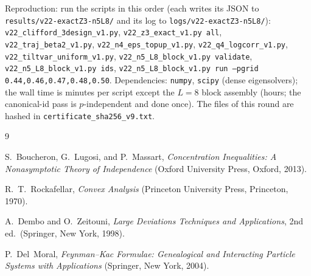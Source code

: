 \documentclass[aps,prx,reprint,superscriptaddress,nobibnotes,longbibliography]{revtex4-2}
\begin{document}
Reproduction: run the scripts in this order (each writes its JSON to
\texttt{results/v22-exactZ3-n5L8/} and its log to
\texttt{logs/v22-exactZ3-n5L8/}): \texttt{v22\_clifford\_3design\_v1.py},
\texttt{v22\_z3\_exact\_v1.py all},
\texttt{v22\_traj\_beta2\_v1.py},
\texttt{v22\_n4\_eps\_topup\_v1.py},
\texttt{v22\_q4\_logcorr\_v1.py},
\texttt{v22\_tiltvar\_uniform\_v1.py},
\texttt{v22\_n5\_L8\_block\_v1.py validate},
\texttt{v22\_n5\_L8\_block\_v1.py ids},
\texttt{v22\_n5\_L8\_block\_v1.py run --pgrid 0.44,0.46,0.47,0.48,0.50}.
Dependencies: \texttt{numpy}, \texttt{scipy} (dense eigensolvers); the
wall time is minutes per script except the $L=8$ block assembly (hours;
the canonical-id pass is $p$-independent and done once).  The files of
this round are hashed in \texttt{certificate\_sha256\_v9.txt}.

\begin{thebibliography}{9}

 S.~Boucheron, G.~Lugosi, and P.~Massart,
\emph{Concentration Inequalities: A Nonasymptotic Theory of Independence}
(Oxford University Press, Oxford, 2013).

 R.~T.~Rockafellar, \emph{Convex Analysis}
(Princeton University Press, Princeton, 1970).

 A.~Dembo and O.~Zeitouni, \emph{Large
Deviations Techniques and Applications}, 2nd ed.\ (Springer, New York,
1998).

 P.~Del~Moral, \emph{Feynman--Kac Formulae:
Genealogical and Interacting Particle Systems with Applications}
(Springer, New York, 2004).

\end{thebibliography}
\end{document}
